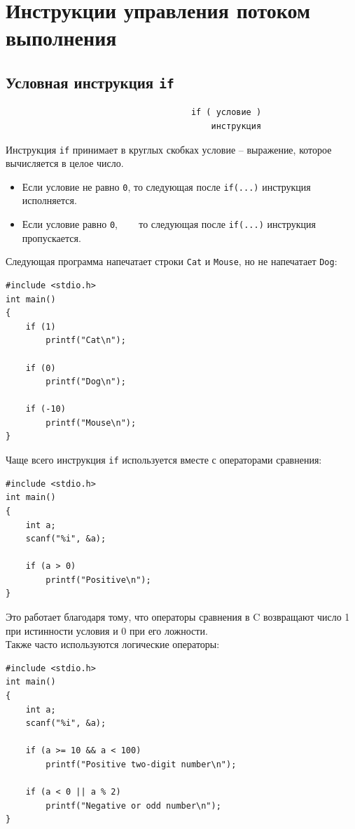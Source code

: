 \documentclass[10pt]{article}
\begin{document}
\newpage
\section*{Инструкции управления потоком выполнения}
\subsection*{Условная инструкция \texttt{if}}
\begin{lstlisting}
                                     if ( условие )
                                         инструкция
\end{lstlisting}
Инструкция \texttt{if} принимает в круглых скобках условие -- выражение, которое вычисляется в целое число. 
\begin{itemize}
\item Если условие не равно \texttt{0}, то следующая после \texttt{if(...)} инструкция исполняется.
\item Если условие равно \texttt{0}, ~~~ то следующая после \texttt{if(...)} инструкция пропускается.
\end{itemize}
Следующая программа напечатает строки \texttt{Cat} и \texttt{Mouse}, но не напечатает \texttt{Dog}:
\begin{lstlisting}
#include <stdio.h>
int main()
{
    if (1)
        printf("Cat\n");

    if (0)
        printf("Dog\n");
        
    if (-10)
        printf("Mouse\n");
}
\end{lstlisting}
Чаще всего инструкция \texttt{if} используется вместе с операторами сравнения:
\begin{lstlisting}
#include <stdio.h>
int main()
{
    int a;
    scanf("%i", &a);

    if (a > 0)
        printf("Positive\n");
}
\end{lstlisting}
Это работает благодаря тому, что операторы сравнения в C возвращают число 1 при истинности условия и 0 при его ложности.\\

\noindent Также часто используются логические операторы:
\begin{lstlisting}
#include <stdio.h>
int main()
{
    int a;
    scanf("%i", &a);

    if (a >= 10 && a < 100)
        printf("Positive two-digit number\n");
        
    if (a < 0 || a % 2)
        printf("Negative or odd number\n");
}
\end{lstlisting}
\end{document}

